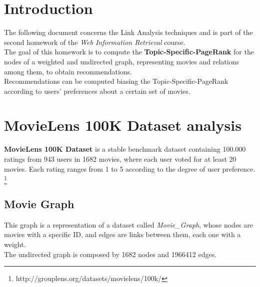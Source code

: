 \documentclass[11pt]{article}
\begin{document}
\section{Introduction}
The following document concerns the Link Analysis techniques and is part of the second homework
of the \textit{Web Information Retrieval} course.\\
The goal of this homework is to compute the \textbf{Topic-Specific-PageRank} for the nodes of
a weighted and undirected graph, representing movies and relations among them, to obtain recommendations.\\
Recommendations can be computed biasing the Topic-Specific-PageRank according to users' preferences about
a certain set of movies.

\section{MovieLens 100K Dataset analysis}
\textbf{MovieLens 100K Dataset} is a stable benchmark dataset containing
 100.000 ratings from 943 users in 1682 movies, where each user voted for at least 20 movies.
 Each rating ranges from 1 to 5 according to the degree of user preference.
 \footnote{http://grouplens.org/datasets/movielens/100k/}\\
\subsection{Movie Graph}
This graph is a representation of a dataset called \textit{Movie\_Graph}, whose nodes are movies
with a specific ID, and edges are links between them, each one with a weight.\\
The undirected graph is composed by 1682 nodes and 1966412 edges.
\end{document}
